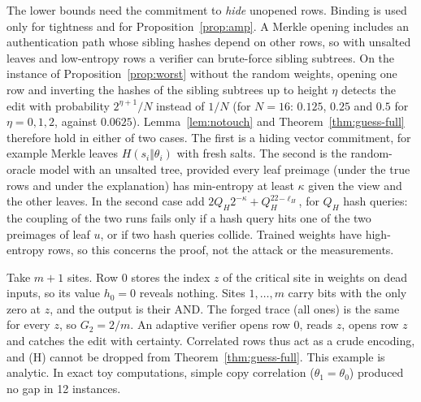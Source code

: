 \begin{remark}[commitments]
\label{rem:merkle}
The lower bounds need the commitment to \emph{hide} unopened rows. Binding is used only for
tightness and for Proposition~\ref{prop:amp}. A Merkle opening includes an authentication path whose
sibling hashes depend on other rows, so with unsalted leaves and low-entropy rows a verifier can
brute-force sibling subtrees. On the instance of Proposition~\ref{prop:worst} without the random
weights, opening one row and inverting the hashes of the sibling subtrees up to height $\eta$ detects
the edit with probability $2^{\eta+1}/N$ instead of $1/N$ (for $N=16$: $0.125$,
$0.25$ and $0.5$ for $\eta=0,1,2$, against $0.0625$). Lemma~\ref{lem:notouch} and
Theorem~\ref{thm:guess-full} therefore hold in either of two cases. The first is a hiding vector
commitment, for example Merkle leaves $H(s_i\Vert\theta_i)$ with fresh salts. The second is the
random-oracle model with an unsalted tree, provided every leaf preimage (under the true rows and
under the explanation) has min-entropy at least $\kappa$ given the view and the other leaves. In the
second case add $2Q_H2^{-\kappa}+Q_H^22^{-\ell_H}$, for $Q_H$ hash queries: the coupling of the two runs fails only if a hash
query hits one of the two preimages of leaf $u$, or if two hash queries collide. Trained weights
have high-entropy rows, so this concerns the proof, not the attack or the measurements.
\end{remark}

\begin{remark}
\label{rem:pointer}
Take $m+1$ sites. Row $0$ stores the index $z$ of the critical site in weights on dead inputs, so
its value $h_0=0$ reveals nothing. Sites $1,\dots,m$ carry bits with the only zero at $z$, and the
output is their AND. The forged trace (all ones) is the same for every $z$, so $G_2=2/m$. An
adaptive verifier opens row $0$, reads $z$, opens row $z$ and catches the edit with certainty.
Correlated rows thus act as a crude encoding, and (H) cannot be dropped from
Theorem~\ref{thm:guess-full}. This example is analytic. In exact toy computations, simple copy
correlation ($\theta_1=\theta_0$) produced no gap in 12 instances.
\end{remark}

